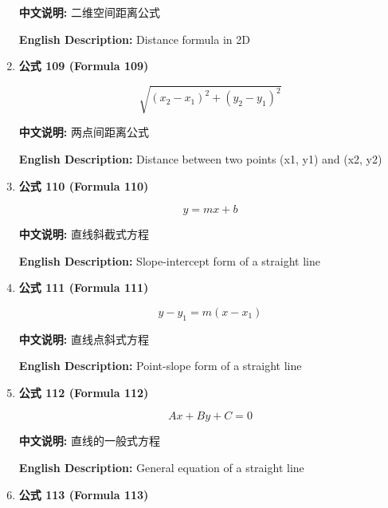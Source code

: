 \documentclass[12pt,a4paper]{article}
\begin{document}
\begin{enumerate}[leftmargin=*]
\textbf{中文说明:} 二维空间距离公式

\textbf{English Description:} Distance formula in 2D

\vspace{0.5cm}

\item \textbf{公式 109 (Formula 109)}

\begin{equation}
\sqrt{(x_2-x_1)^2 + (y_2-y_1)^2}
\end{equation}

\textbf{中文说明:} 两点间距离公式

\textbf{English Description:} Distance between two points (x1, y1) and (x2, y2)

\vspace{0.5cm}

\item \textbf{公式 110 (Formula 110)}

\begin{equation}
y = mx + b
\end{equation}

\textbf{中文说明:} 直线斜截式方程

\textbf{English Description:} Slope-intercept form of a straight line

\vspace{0.5cm}

\item \textbf{公式 111 (Formula 111)}

\begin{equation}
y - y_1 = m(x - x_1)
\end{equation}

\textbf{中文说明:} 直线点斜式方程

\textbf{English Description:} Point-slope form of a straight line

\vspace{0.5cm}

\item \textbf{公式 112 (Formula 112)}

\begin{equation}
Ax + By + C = 0
\end{equation}

\textbf{中文说明:} 直线的一般式方程

\textbf{English Description:} General equation of a straight line

\vspace{0.5cm}

\item \textbf{公式 113 (Formula 113)}


\end{enumerate}
\end{document}
